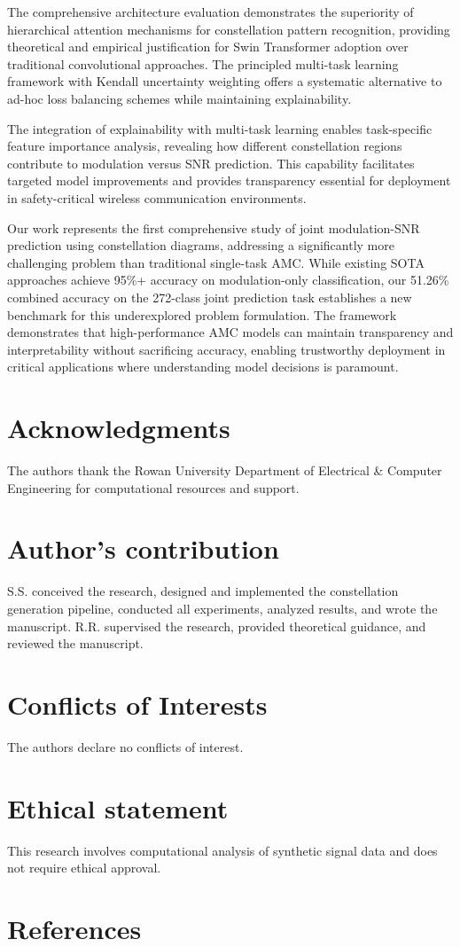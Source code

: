 \documentclass{ELSP}
\begin{document}
The comprehensive architecture evaluation demonstrates the superiority of hierarchical attention mechanisms for constellation pattern recognition, providing theoretical and empirical justification for Swin Transformer adoption over traditional convolutional approaches. The principled multi-task learning framework with Kendall uncertainty weighting offers a systematic alternative to ad-hoc loss balancing schemes while maintaining explainability.

The integration of explainability with multi-task learning enables task-specific feature importance analysis, revealing how different constellation regions contribute to modulation versus SNR prediction. This capability facilitates targeted model improvements and provides transparency essential for deployment in safety-critical wireless communication environments.

Our work represents the first comprehensive study of joint modulation-SNR prediction using constellation diagrams, addressing a significantly more challenging problem than traditional single-task AMC. While existing SOTA approaches achieve 95\%+ accuracy on modulation-only classification, our 51.26\% combined accuracy on the 272-class joint prediction task establishes a new benchmark for this underexplored problem formulation. The framework demonstrates that high-performance AMC models can maintain transparency and interpretability without sacrificing accuracy, enabling trustworthy deployment in critical applications where understanding model decisions is paramount.

\section*{Acknowledgments}
 
The authors thank the Rowan University Department of Electrical \& Computer Engineering for computational resources and support.

\section*{Author's contribution}

S.S. conceived the research, designed and implemented the constellation generation pipeline, conducted all experiments, analyzed results, and wrote the manuscript. R.R. supervised the research, provided theoretical guidance, and reviewed the manuscript.

\section*{Conflicts of Interests}

The authors declare no conflicts of interest.

\section*{Ethical statement}

This research involves computational analysis of synthetic signal data and does not require ethical approval.

\section*{References}
\setlength{\parindent}{0em}


\end{document}
